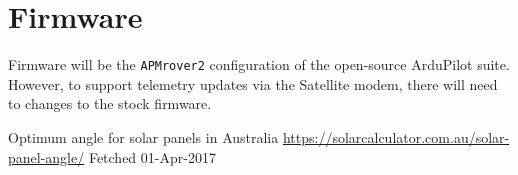 \section{Firmware}
Firmware will be the \texttt{APMrover2} configuration of the open-source ArduPilot suite. However, to support telemetry updates via the Satellite modem, there will need to changes to the stock firmware.

\begin{thebibliography}{9}
 Optimum angle for solar panels in Australia
 \url{https://solarcalculator.com.au/solar-panel-angle/}
 Fetched 01-Apr-2017
\end{thebibliography}


